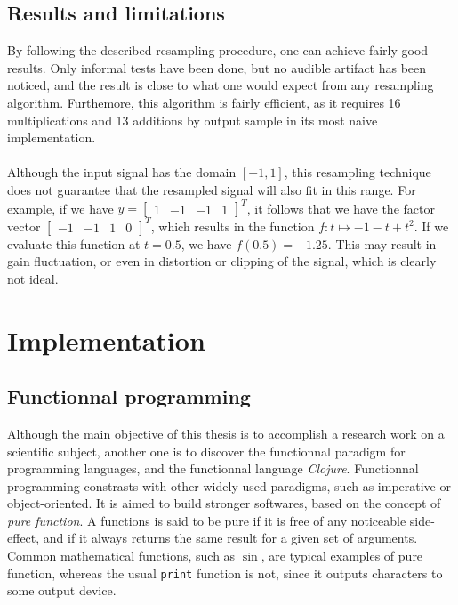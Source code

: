 \documentclass[letterpaper]{article}
\newcommand*{\codeinl}{\texttt}
\theoremstyle{definition}
\theoremstyle{remark}
\begin{document}
\subsection{Results and limitations}
By following the described resampling procedure, one can achieve fairly good
results. Only informal tests have been done, but no audible artifact has been
noticed, and the result is close to what one would expect from any resampling
algorithm. Furthemore, this algorithm is fairly efficient, as it requires
16 multiplications and 13 additions by output sample in its most naive
implementation.

\paragraph{}
Although the input signal has the domain \([-1,1]\), this resampling technique
does not guarantee that the resampled signal will also fit in this range. For
example, if we have
\(y=\begin{bmatrix}1&-1&-1&1\end{bmatrix}^T\), it follows
that we have the factor vector
\(\begin{bmatrix}-1&-1&1&0\end{bmatrix}^T\), which results
in the function \(f:t\mapsto -1-t+t^2\). If we evaluate this function at
\(t=0.5\), we have \(f(0.5)=-1.25\).  This may result in gain fluctuation, or
even in distortion or clipping of the signal, which is clearly not ideal.

\section{Implementation}

\subsection{Functionnal programming}
Although the main objective of this thesis is to accomplish a research work on a
scientific subject, another one is to discover the functionnal paradigm for
programming languages, and the functionnal language \emph{Clojure}. Functionnal
programming constrasts with other widely-used paradigms, such as imperative or
object-oriented. It is aimed to build stronger softwares, based on the concept
of \emph{pure function}. A functions is said to be pure if it is free of any
noticeable side-effect, and if it always returns the same result for a given set
of arguments. Common mathematical functions, such as \(\sin\), are typical
examples of pure function, whereas the usual \codeinl{print} function is not,
since it outputs characters to some output device.
\end{document}
